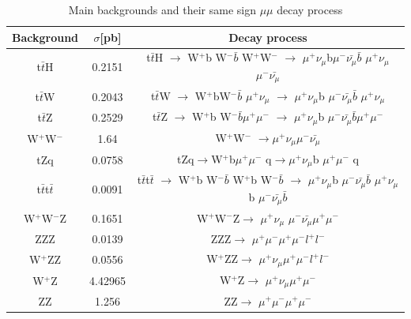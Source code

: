 \begin{linenumbers}
\begin{table}
\caption{Main backgrounds and their same sign $\mu\mu$ decay process}
\centering
\begin{tabular}{|c|c|c|}
	\hline
	Background & $\sigma$[pb] & Decay process \\
	\hline
t$\bar{t}$H	& 0.2151 & t$\bar{t}$H $\rightarrow$ W$^+$b W$^- \bar{b}$ W$^+$W$^-$ $\rightarrow$ $\mu^+ \nu_\mu$b$\mu^- \bar{\nu_\mu}\bar{b}$ $\mu^+\nu_\mu$ $\mu^-\bar{\nu_\mu}$\\
\hline  
t$\bar{t}$W  &0.2043 &t$\bar{t}$W  $\rightarrow$  W$^+$bW$^- \bar{b}$ $\mu^+\nu_\mu$ $\rightarrow$ $\mu^+ \nu_\mu$b $\mu^- \bar{\nu_\mu} \bar{b}$ $\mu^+ \nu_\mu$\\
\hline
 t$\bar{t}$Z & 0.2529 & t$\bar{t}$Z  $\rightarrow$ W$^+$b  W$^-$$\bar{b} \mu^+ \mu^-$ $\rightarrow$ $\mu^+ \nu_\mu$b $\mu^- \bar{\nu_\mu} \bar{b}\mu^+ \mu^-$  \\
 \hline 
  W$^+$W$^-$  &1.64 & W$^+$W$^-$ $\rightarrow$$\mu^+\nu_\mu$$\mu^-\bar{\nu_\mu}$ \\
    \hline 
  tZq  &0.0758 & tZq$\rightarrow$W$^+$b$\mu^+ \mu^-$ q$\rightarrow$$\mu^+ \nu_\mu$b $\mu^+\mu^-$ q \\
    \hline 
  t$\bar{t}$t$\bar{t}$  & 0.0091&t$\bar{t}$t$\bar{t}$ $\rightarrow$ W$^+$b   W$^- \bar{b}$  W$^+$b  W$^- \bar{b}$   $\rightarrow$ $\mu^+ \nu_\mu$b $\mu^- \bar{\nu_\mu} \bar{b}$ $\mu^+ \nu_\mu$b   $\mu^- \bar{\nu_\mu} \bar{b}$ \\
    \hline 
  W$^+$W$^-$Z  & 0.1651& W$^+$W$^-$Z$\rightarrow$ $\mu^+ \nu_\mu$ $\mu^- \bar{\nu_\mu} \mu^+ \mu^-$\\
    \hline 
 ZZZ  &0.0139 & ZZZ$\rightarrow$ $\mu^+ \mu^-\mu^+ \mu^-l^+ l^-$  \\
    \hline 
  W$^+$ZZ  & 0.0556&W$^+$ZZ$\rightarrow$ $\mu^+ \nu_\mu \mu^+ \mu^- l^+l^-$ \\
  \hline 
 W$^+$Z &4.42965 &W$^+$Z$\rightarrow$ $\mu^+ \nu_\mu \mu^+ \mu^-$ \\
 \hline
ZZ &  1.256 &ZZ$\rightarrow$ $\mu^+ \mu^- \mu^+ \mu^-$ \\
 \hline
\end{tabular}
\end{table}





\end{linenumbers}
